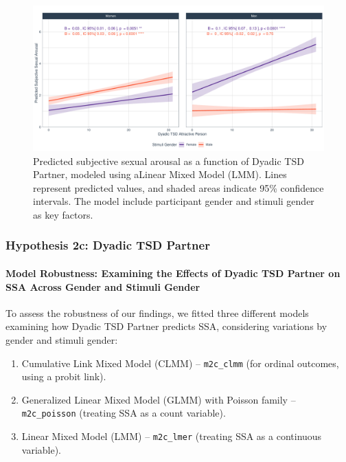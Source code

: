 \documentclass[
  bookmarksnumbered]{article}
\providecommand{\tightlist}{%
  \setlength{\itemsep}{0pt}\setlength{\parskip}{0pt}}
\begin{document}
\begin{figure}
\centering
\includegraphics{Sexual_Desire_Arousal_files/figure-latex/fig-h2b-1.pdf}
\caption{\label{fig:fig-h2b}Predicted subjective sexual arousal as a function of Dyadic TSD Partner, modeled using aLinear Mixed Model (LMM). Lines represent predicted values, and shaded areas indicate 95\% confidence intervals. The model include participant gender and stimuli gender as key factors.}
\end{figure}

\subsubsection{Hypothesis 2c: Dyadic TSD Partner}\label{hyp2c}

\paragraph{Model Robustness: Examining the Effects of Dyadic TSD Partner on SSA Across Gender and Stimuli Gender}\label{model-robustness-examining-the-effects-of-dyadic-tsd-partner-on-ssa-across-gender-and-stimuli-gender}

To assess the robustness of our findings, we fitted three different models examining how Dyadic TSD Partner predicts SSA, considering variations by gender and stimuli gender:

\begin{enumerate}
\def\labelenumi{\arabic{enumi}.}
\tightlist
\item
  Cumulative Link Mixed Model (CLMM) -- \texttt{m2c\_clmm} (for ordinal outcomes, using a probit link).
\item
  Generalized Linear Mixed Model (GLMM) with Poisson family -- \texttt{m2c\_poisson} (treating SSA as a count variable).
\item
  Linear Mixed Model (LMM) -- \texttt{m2c\_lmer} (treating SSA as a continuous variable).
\end{enumerate}
\end{document}
